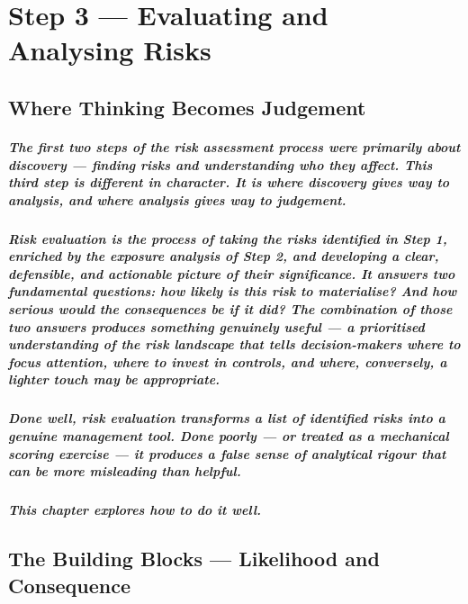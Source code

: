 \chapter{Step 3 — Evaluating and Analysing Risks}
\label{chap:Step 3 — Evaluating and Analysing Risks}

\section{Where Thinking Becomes Judgement}
\paragraph{The first two steps of the risk assessment process were primarily about discovery — finding risks and understanding who they affect. This third step is different in character. It is where discovery gives way to analysis, and where analysis gives way to judgement.}
\paragraph{Risk evaluation is the process of taking the risks identified in Step 1, enriched by the exposure analysis of Step 2, and developing a clear, defensible, and actionable picture of their significance. It answers two fundamental questions: how likely is this risk to materialise? And how serious would the consequences be if it did? The combination of those two answers produces something genuinely useful — a prioritised understanding of the risk landscape that tells decision-makers where to focus attention, where to invest in controls, and where, conversely, a lighter touch may be appropriate.}
\paragraph{Done well, risk evaluation transforms a list of identified risks into a genuine management tool. Done poorly — or treated as a mechanical scoring exercise — it produces a false sense of analytical rigour that can be more misleading than helpful.}
\paragraph{This chapter explores how to do it well.}

\section{The Building Blocks — Likelihood and Consequence}
